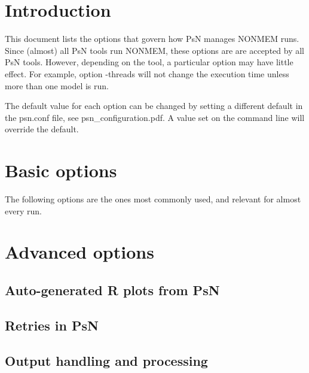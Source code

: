 

\usepackage{hyperref}



\maketitle
\newcommand{\guidetoolname}{<toolname>}
\tableofcontents
\newpage

\section{Introduction}
This document lists the options that govern how PsN manages NONMEM runs. Since (almost) all PsN tools run NONMEM, these options are 
are accepted by all PsN tools. However, depending on the tool, a particular option may have little effect. For example, option -threads will not change the execution time unless more than one model is run. 

The default value for each option can be changed by setting a different default in the psn.conf file, see psn\_configuration.pdf. A value set on the command line will override the default.

\section{Basic options}
The following options are the ones most commonly used, and relevant for almost every run.


\section{Advanced options}
\subsection{Auto-generated R plots from PsN}
\newcommand{\rplotsconditions}{}


\subsection{Retries in PsN}


\subsection{Output handling and processing}


